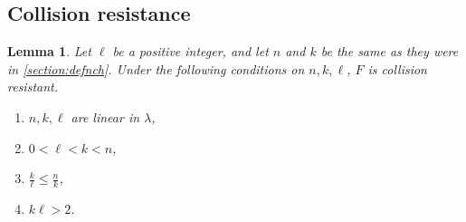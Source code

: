 \documentclass{article}
\newtheorem{lemma}{Lemma}[section]
\begin{document}
\subsection{Collision resistance}
\begin{lemma}
Let $\ell$ be a positive integer, and let $n$ and $k$ be the same as they were in \cref{section:defnch}. Under the following conditions on $n, k, \ell$, $F$ is collision resistant.
\begin{enumerate}
	\item $n, k, \ell$ are linear in $\lambda$,
	\item $0 < \ell < k < n$,
	\item $\frac{k}{\ell} \leq \frac{n}{k}$,
	\item $k \ell > 2$.
\end{enumerate}
\end{lemma}
\end{document}
